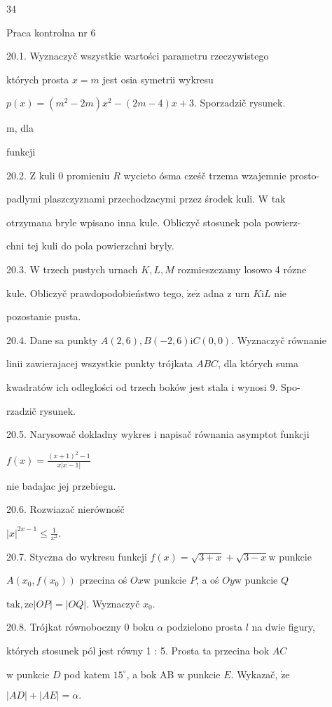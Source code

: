 \documentclass[a4paper,12pt]{article}
\begin{document}
34

Praca kontrolna nr 6

20.1. Wyznaczyč wszystkie wartości parametru rzeczywistego

których prosta $x = m$ jest osia symetrii wykresu

$p(x)=(m^{2}-2m)x^{2}-(2m-4)x+3$. Sporzadzič rysunek.

m, dla

funkcji

20.2. $\mathrm{Z}$ kuli $0$ promieniu $R$ wycieto ósma cześč trzema wzajemnie prosto-

padlymi plaszczyznami przechodzacymi przez środek kuli. $\mathrm{W}$ tak

otrzymana bryle wpisano inna kule. Obliczyč stosunek pola powierz-

chni tej kuli do pola powierzchni bryly.

20.3. $\mathrm{W}$ trzech pustych urnach $K, L, M$ rozmieszczamy losowo 4 rózne

kule. Obliczyč prawdopodobieństwo tego, $\dot{\mathrm{z}}\mathrm{e}\dot{\mathrm{z}}$ adna $\mathrm{z}$ urn $K\mathrm{i}L$ nie

pozostanie pusta.

20.4. Dane sa punkty $A(2,6), B(-2,6) \mathrm{i} C(0,0)$. Wyznaczyč równanie

linii zawierajacej wszystkie punkty trójkata $ABC$, dla których suma

kwadratów ich odleglości od trzech boków jest stala $\mathrm{i}$ wynosi 9. Spo-

rzadzič rysunek.

20.5. Narysowač dokladny wykres $\mathrm{i}$ napisač równania asymptot funkcji

$f(x)=\displaystyle \frac{(x+1)^{2}-1}{x|x-1|}$

nie badajac jej przebiegu.

20.6. Rozwiazač nierównośč

$|x|^{2x-1}\displaystyle \leq\frac{1}{x^{2}}.$

20.7. Styczna do wykresu funkcji $f(x) = \sqrt{3+x}+\sqrt{3-x} \mathrm{w}$ punkcie

$A(x_{0},f(x_{0}))$ przecina oś $Ox \mathrm{w}$ punkcie $P$, a oś $Oy \mathrm{w}$ punkcie $Q$

$\mathrm{t}\mathrm{a}\mathrm{k}, \dot{\mathrm{z}}\mathrm{e} |OP|=|OQ|$. Wyznaczyč $x_{0}.$

20.8. Trójkat równoboczny $0$ boku $\alpha$ podzielono prosta $l$ na dwie figury,

których stosunek pól jest równy 1 : 5. Prosta ta przecina bok $AC$

$\mathrm{w}$ punkcie $D$ pod katem $15^{\circ}$, a bok AB $\mathrm{w}$ punkcie $E$. Wykazač, $\dot{\mathrm{z}}\mathrm{e}$

$|AD|+|AE|=\alpha.$
\end{document}
